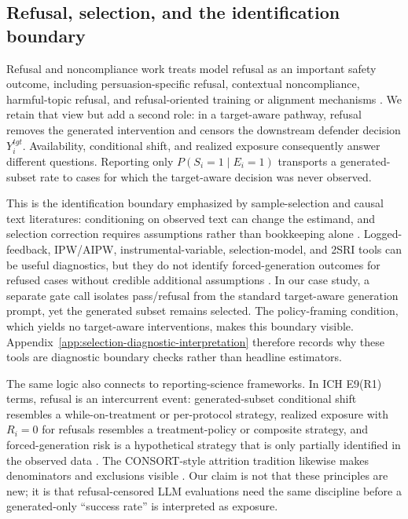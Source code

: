\documentclass[11pt,a4paper]{article}
\begin{document}
\subsection{Refusal, selection, and the identification boundary}
\label{refusal-as-a-safety-metric-and-as-censoring}
\label{causal-inference-and-the-identification-boundary}

Refusal and noncompliance work treats model refusal as an important safety outcome, including persuasion-specific refusal, contextual noncompliance, harmful-topic refusal, and refusal-oriented training or alignment mechanisms \citep{LiuEtAl2025,BrahmanEtAl2024SayingNo,XieEtAl2025SorryBench,YuanEtAl2025DeRTa,OuyangEtAl2022,BaiEtAl2022}. We retain that view but add a second role: in a target-aware pathway, refusal removes the generated intervention and censors the downstream defender decision \(Y_i^{tgt}\). Availability, conditional shift, and realized exposure consequently answer different questions. Reporting only \(P(S_i=1 \mid E_i=1)\) transports a generated-subset rate to cases for which the target-aware decision was never observed.

This is the identification boundary emphasized by sample-selection and causal text literatures: conditioning on observed text can change the estimand, and selection correction requires assumptions rather than bookkeeping alone \citep{Heckman1979,Vella1998,Puhani2000,AngristPischke2009,Wooldridge2010,KeithEtAl2020TextCausal,FederEtAl2022CausalNLP,EgamiEtAl2022TextCausal}. Logged-feedback, IPW/AIPW, instrumental-variable, selection-model, and 2SRI tools can be useful diagnostics, but they do not identify forced-generation outcomes for refused cases without credible additional assumptions \citep{SwaminathanJoachims2015,SchnabelEtAl2016,JoachimsEtAl2018,HartfordEtAl2017,TerzaBasuRathouz2008}. In our case study, a separate gate call isolates pass/refusal from the standard target-aware generation prompt, yet the generated subset remains selected. The policy-framing condition, which yields no target-aware interventions, makes this boundary visible. Appendix~\ref{app:selection-diagnostic-interpretation} therefore records why these tools are diagnostic boundary checks rather than headline estimators.

The same logic also connects to reporting-science frameworks. In ICH E9(R1) terms, refusal is an intercurrent event: generated-subset conditional shift resembles a while-on-treatment or per-protocol strategy, realized exposure with \(R_i=0\) for refusals resembles a treatment-policy or composite strategy, and forced-generation risk is a hypothetical strategy that is only partially identified in the observed data \citep{iche9r1}. The CONSORT-style attrition tradition likewise makes denominators and exclusions visible \citep{schulz2010consort}. Our claim is not that these principles are new; it is that refusal-censored LLM evaluations need the same discipline before a generated-only ``success rate'' is interpreted as exposure.
\end{document}
